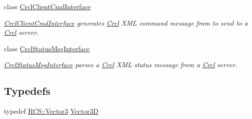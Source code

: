 \begin{DoxyCompactItemize}
class \hyperlink{classCrcl_1_1CrclClientCmdInterface}{Crcl\-Client\-Cmd\-Interface}
\begin{DoxyCompactList}\small\item\em \hyperlink{classCrcl_1_1CrclClientCmdInterface}{Crcl\-Client\-Cmd\-Interface} generates \hyperlink{namespaceCrcl}{Crcl} X\-M\-L command message from to send to a \hyperlink{namespaceCrcl}{Crcl} server. \end{DoxyCompactList}\item 
class \hyperlink{classCrcl_1_1CrclStatusMsgInterface}{Crcl\-Status\-Msg\-Interface}
\begin{DoxyCompactList}\small\item\em \hyperlink{classCrcl_1_1CrclStatusMsgInterface}{Crcl\-Status\-Msg\-Interface} parses a \hyperlink{namespaceCrcl}{Crcl} X\-M\-L status message from a \hyperlink{namespaceCrcl}{Crcl} server. \end{DoxyCompactList}\end{DoxyCompactItemize}
\subsection*{Typedefs}
\begin{DoxyCompactItemize}
\item 
typedef \hyperlink{namespaceRCS_a688a9db9f1e17b76c410c539997d07a7}{R\-C\-S\-::\-Vector3} \hyperlink{namespaceCrcl_a8d272fb6207c4f4195f4309c71d00a9c}{Vector3\-D}
\end{DoxyCompactItemize}

